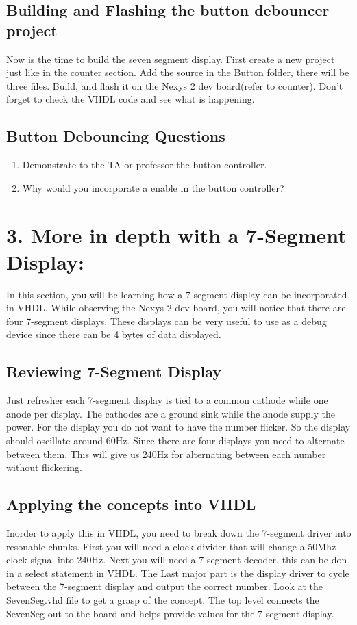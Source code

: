 \documentclass{article}
\begin{document}
\subsection{Building and Flashing the button debouncer project}
Now is the time to build the seven segment display. First create a new project just like in the counter section. Add the source in the Button folder, there will be three files. Build, and flash it on the Nexys 2 dev board(refer to counter). Don't forget to check the VHDL code and see what is happening.

\subsection{Button Debouncing Questions}

\begin{enumerate}
  \item Demonstrate to the TA or professor the button controller.
  \item Why would you incorporate a enable in the button controller?
\end{enumerate}

\newpage

\section{3. More in depth with a 7-Segment Display:}
In this section, you will be learning how a 7-segment display can be incorporated in VHDL. While observing the Nexys 2 dev board, you will notice that there are four 7-segment displays. These displays can be very useful to use as a debug device since there can be 4 bytes of data displayed.

\subsection{Reviewing 7-Segment Display}
Just refresher each 7-segment display is tied to a common cathode while one anode per display. The cathodes are a ground sink while the anode supply the power. For the display you do not want to have the number flicker. So the display should oscillate around 60Hz. Since there are four displays you need to alternate between them. This will give us 240Hz for alternating between each number without flickering.

\subsection{Applying the concepts into VHDL}
Inorder to apply this in VHDL, you need to break down the 7-segment driver into resonable chunks. First you will need a clock divider that will change a 50Mhz clock signal into 240Hz. Next you will need a 7-segment decoder, this can be don in a select statement in VHDL. The Last major part is the display driver to cycle between the 7-segment display and output the correct number. Look at the SevenSeg.vhd file to get a grasp of the concept. The top level connects the SevenSeg out to the board and helps provide values for the 7-segment display.
\end{document}
